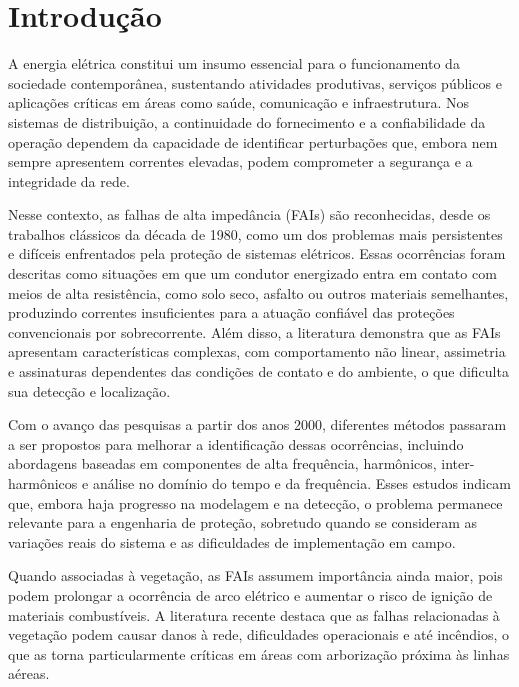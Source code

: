 %
%
\chapter{Introdução}\label{chap:introducao}

A energia elétrica constitui um insumo essencial para o funcionamento da sociedade contemporânea, sustentando atividades produtivas, serviços públicos e aplicações críticas em áreas como saúde, comunicação e infraestrutura. Nos sistemas de distribuição, a continuidade do fornecimento e a confiabilidade da operação dependem da capacidade de identificar perturbações que, embora nem sempre apresentem correntes elevadas, podem comprometer a segurança e a integridade da rede.

Nesse contexto, as falhas de alta impedância (FAIs) são reconhecidas, desde os trabalhos clássicos da década de 1980, como um dos problemas mais persistentes e difíceis enfrentados pela proteção de sistemas elétricos. \cite{1,2} Essas ocorrências foram descritas como situações em que um condutor energizado entra em contato com meios de alta resistência, como solo seco, asfalto ou outros materiais semelhantes, produzindo correntes insuficientes para a atuação confiável das proteções convencionais por sobrecorrente. \cite{3} Além disso, a literatura demonstra que as FAIs apresentam características complexas, com comportamento não linear, assimetria e assinaturas dependentes das condições de contato e do ambiente, o que dificulta sua detecção e localização. \cite{4,5}

Com o avanço das pesquisas a partir dos anos 2000, diferentes métodos passaram a ser propostos para melhorar a identificação dessas ocorrências, incluindo abordagens baseadas em componentes de alta frequência, harmônicos, inter-harmônicos e análise no domínio do tempo e da frequência. \cite{5,6,7,8} Esses estudos indicam que, embora haja progresso na modelagem e na detecção, o problema permanece relevante para a engenharia de proteção, sobretudo quando se consideram as variações reais do sistema e as dificuldades de implementação em campo. \cite{6,7}

Quando associadas à vegetação, as FAIs assumem importância ainda maior, pois podem prolongar a ocorrência de arco elétrico e aumentar o risco de ignição de materiais combustíveis. A literatura recente destaca que as falhas relacionadas à vegetação podem causar danos à rede, dificuldades operacionais e até incêndios, o que as torna particularmente críticas em áreas com arborização próxima às linhas aéreas. \cite{8,9}

